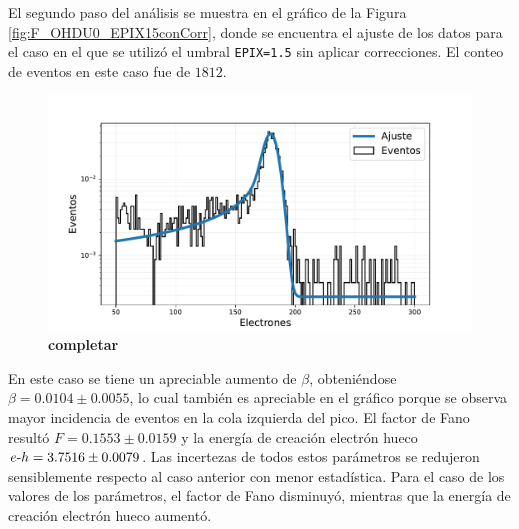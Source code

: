 El segundo paso del análisis se muestra en el gráfico de la Figura \ref{fig:F_OHDU0_EPIX15conCorr}, donde se encuentra el ajuste de los datos para el caso en el que se utilizó el umbral \verb|EPIX=1.5| sin aplicar correcciones. El conteo de eventos en este caso fue de $1812$.
\begin{figure}[h]
    \centering
        \includegraphics[scale=0.5]{Figs/HistFit_F_EPIX15_OHDU1.pdf}
    \caption{\footnotesize{\textbf{completar}}}
    \label{fig:F_OHDU0_EPIX15sinCorr}
\end{figure}
En este caso se tiene un apreciable aumento de $\beta$, obteniéndose $\beta = 0.0104 \pm 0.0055$, lo cual también es apreciable en el gráfico porque se observa mayor incidencia de eventos en la cola izquierda del pico. El factor de Fano resultó $F = 0.1553 \pm 0.0159$ y la energía de creación electrón hueco $e\mbox{-}h = 3.7516 \pm 0.0079$. Las incertezas de todos estos parámetros se redujeron sensiblemente respecto al caso anterior con menor estadística. Para el caso de los valores de los parámetros, el factor de Fano disminuyó, mientras que la energía de creación electrón hueco aumentó.

